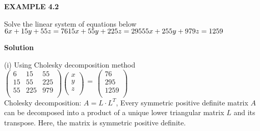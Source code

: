 \documentclass[a4paper, 12pt]{report}
\newcommand{\sps}{\\[0.2cm]}
\newcommand{\dsp}{\displaystyle}
\begin{document}
{\begin{center}
	\textbf{EXAMPLE 4.2}
\end{center}
 Solve the linear system of equations below\sps
$
6x + 15y + 55z = 76\\
15x + 55y + 225z = 295\\
55x + 255y + 979z = 1259\\
$\sps
\begin{center}
	\textbf{Solution}
\end{center}
(i) Using Cholesky decomposition method\sps
$\dsp
\left(
\begin{array}{ccc}
6 & 15 & 55\\
15 & 55 & 225\\
55 & 225 & 979\\
\end{array}
\right)
\left(
\begin{array}{c}
x\\y\\z\\
\end{array}
\right)
\begin{array}{c}
~\\=\\~\\
\end{array}
\left(
\begin{array}{c}
76\\295\\1259\\
\end{array}
\right)
$\sps
Cholesky decomposition: $A=L\cdot L^T$, Every symmetric positive definite matrix $A$ can be decomposed into a product of a unique lower triangular matrix $L$ and its transpose. Here, the matrix is symmetric positive definite.\sps

}
\end{document}
